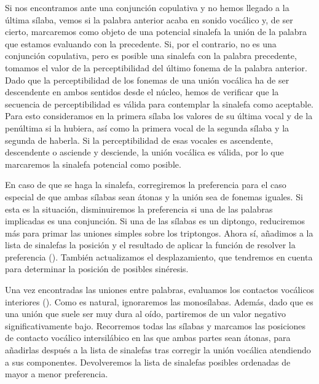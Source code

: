 Si nos encontramos ante una conjunción copulativa y no hemos llegado a la última sílaba, vemos si la palabra anterior acaba en sonido vocálico y, de ser cierto, marcaremos como objeto de una potencial sinalefa la unión de la palabra que estamos evaluando con la precedente. Si, por el contrario, no es una conjunción copulativa, pero es posible una sinalefa con la palabra precedente, tomamos el valor de la perceptibilidad del último fonema de la palabra anterior. Dado que la perceptibilidad de los fonemas de una unión vocálica ha de ser descendente en ambos sentidos desde el núcleo, hemos de verificar que la secuencia de perceptibilidad es válida para contemplar la sinalefa como aceptable. Para esto consideramos en la primera sílaba los valores de su última vocal y de la penúltima si la hubiera, así como la primera vocal de la segunda sílaba y la segunda de haberla. Si la perceptibilidad de esas vocales es ascendente, descendente o asciende y desciende, la unión vocálica es  válida, por lo que marcaremos la sinalefa potencial como posible.

En caso de que se haga la sinalefa, corregiremos la preferencia para el caso especial de que ambas sílabas sean átonas y la unión sea de fonemas iguales. Si esta es la situación, disminuiremos la preferencia si una de las palabras implicadas es una conjunción. Si una de las sílabas es un diptongo, reduciremos más para primar las uniones simples sobre los triptongos. Ahora sí, añadimos a la lista de sinalefas la posición y el resultado de aplicar la función de resolver la preferencia (). También actualizamos el desplazamiento, que tendremos en cuenta para determinar la posición de posibles sinéresis.

Una vez encontradas las uniones entre palabras, evaluamos los contactos vocálicos interiores (). Como es natural, ignoraremos las monosílabas. Además, dado que es una unión que suele ser muy dura al oído, partiremos de un valor negativo significativamente bajo. Recorremos todas las sílabas y marcamos las posiciones de contacto vocálico intersilábico en las que ambas partes sean átonas, para añadirlas después a la lista de sinalefas tras corregir la unión vocálica atendiendo a sus componentes. Devolveremos la lista de sinalefas posibles ordenadas de mayor a menor preferencia.

